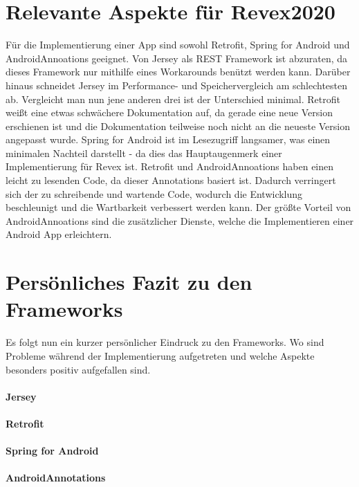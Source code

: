 \section{Relevante Aspekte für Revex2020}
Für die Implementierung einer App sind sowohl Retrofit, Spring for Android und AndroidAnnoations geeignet. Von Jersey als REST Framework ist abzuraten, da dieses Framework nur mithilfe eines Workarounds benützt werden kann. Darüber hinaus schneidet Jersey im Performance- und Speichervergleich am schlechtesten ab. Vergleicht man nun jene anderen drei ist der Unterschied minimal. Retrofit weißt eine etwas schwächere Dokumentation auf, da gerade eine neue Version erschienen ist und die Dokumentation teilweise noch nicht an die neueste Version angepasst wurde. Spring for Android ist im Lesezugriff langsamer, was einen minimalen Nachteil darstellt - da dies das Hauptaugenmerk einer Implementierung für Revex ist. Retrofit und AndroidAnnoations haben einen leicht zu lesenden Code, da dieser Annotations basiert ist. Dadurch verringert sich der zu schreibende und wartende Code, wodurch die Entwicklung beschleunigt und die Wartbarkeit verbessert werden kann. Der größte Vorteil von AndroidAnnoations sind die zusätzlicher Dienste, welche die Implementieren einer Android App erleichtern.

\section{Persönliches Fazit zu den Frameworks}
Es folgt nun ein kurzer persönlicher Eindruck zu den Frameworks. Wo sind Probleme während der Implementierung aufgetreten und welche Aspekte besonders positiv aufgefallen sind.
\\\\
\textbf{Jersey}
\\\\
\textbf{Retrofit}
\\\\
\textbf{Spring for Android}
\\\\
\textbf{AndroidAnnotations}
\\\\